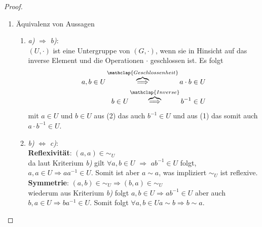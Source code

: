 \documentclass{../problemset}
\begin{document}
\begin{problem}
\begin{proof}
	\begin{enumerate}
		\item Äquivalenz von Aussagen
		      \begin{enumerate}[label=\alph*)]
			      \item \textit{a)} $\Longrightarrow$ \textit{b)}: \\
			            $(U, \cdot)$ ist eine Untergruppe von $(G, \cdot)$, wenn sie in Hinsicht auf das inverse Element und die Operationen $\cdot$ geschlossen ist.
			            Es folgt \begin{align}
				            a, b \in U \overbrace{\Longrightarrow}^{\mathclap{Geschlossenheit}} a \cdot b \in U \\
				            b \in U \overbrace{\Longrightarrow}^{\mathclap{Inverse}} b^{-1} \in U
			            \end{align} mit $a \in U$ und $b \in U$ aus (2) das auch $b^{-1} \in U$ und aus (1) das somit auch $a \cdot b^{-1} \in U$.
			            \checkmark
			      \item \textit{b)} $\Longleftrightarrow$ \textit{c)}: \\
			            \textbf{Reflexivität}: $(a, a) \in \sim_U$ \\
			            da laut Kriterium \textit{b)} gilt $\forall a,b \in U$ $\Longrightarrow$ $ab^{-1} \in U$ folgt,
			            $a, a \in U \Longrightarrow aa^{-1} \in U$. Somit ist aber $a \sim a$, was impliziert $\sim_U$ ist reflexive.
			            \checkmark \\
			            \textbf{Symmetrie}: $(a, b) \in \sim_U \Longrightarrow (b,a) \in \sim_U$ \\
			            wiederum aus Kriterium \textit{b)} folgt $a, b \in U \Longrightarrow ab^{-1} \in U$ aber auch $b,a \in U \Longrightarrow ba^{-1} \in U$.
			            Somit folgt $\forall a,b \in U a \sim b \Longrightarrow b \sim a$.
			            \checkmark \\

		      \end{enumerate}

	\end{enumerate}
\end{proof}


\end{problem}
\end{document}
